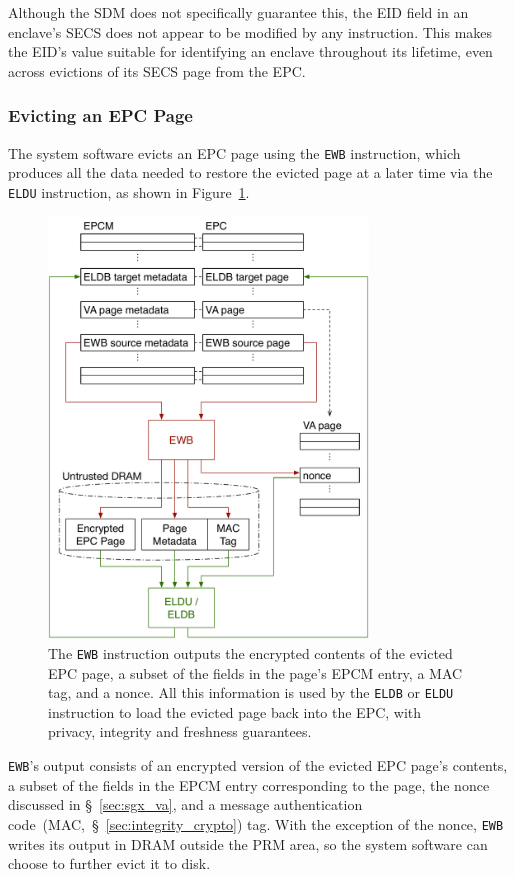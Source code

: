 Although the SDM does not specifically guarantee this, the EID field in an
enclave's SECS does not appear to be modified by any instruction. This makes
the EID's value suitable for identifying an enclave throughout its lifetime,
even across evictions of its SECS page from the EPC.


\subsubsection{Evicting an EPC Page}
\label{sec:sgx_ewb}

The system software evicts an EPC page using the \texttt{EWB} instruction,
which produces all the data needed to restore the evicted page at a later time
via the \texttt{ELDU} instruction, as shown in Figure~\ref{fig:sgx_eviction}.

\begin{figure}[hbt]
  \centering
  \includegraphics[width=85mm]{figures/sgx_eviction.pdf}
  \caption{
    The \texttt{EWB} instruction outputs the encrypted contents of the
    evicted EPC page, a subset of the fields in the page's EPCM entry, a
    MAC tag, and a nonce. All this information is used by the \texttt{ELDB} or
    \texttt{ELDU} instruction to load the evicted page back into the EPC, with
    privacy, integrity and freshness guarantees.
  }
  \label{fig:sgx_eviction}
\end{figure}


\texttt{EWB}'s output consists of an encrypted version of the evicted EPC
page's contents, a subset of the fields in the EPCM entry corresponding to the
page, the nonce discussed in \S~\ref{sec:sgx_va}, and a message authentication
code~(MAC,~\S~\ref{sec:integrity_crypto}) tag. With the exception of the nonce,
\texttt{EWB} writes its output in DRAM outside the PRM area, so the system
software can choose to further evict it to disk.

